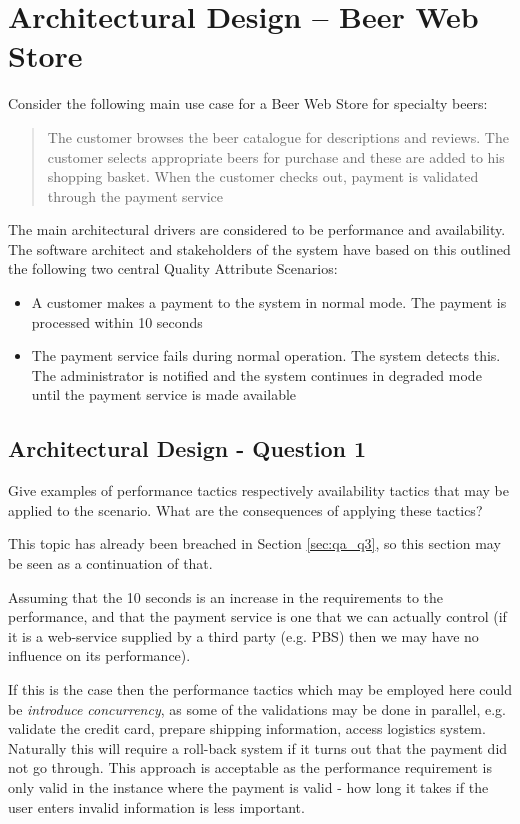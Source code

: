 \section{Architectural Design -- Beer Web Store}
Consider the following main use case for a Beer Web Store for specialty
beers:
\begin{quote}
  The customer browses the beer catalogue for descriptions and
  reviews. The customer selects appropriate beers for purchase and
  these are added to his shopping basket. When the customer checks
  out, payment is validated through the payment service
\end{quote}
The main architectural drivers are considered to be performance and
availability. The software architect and stakeholders of the system
have based on this outlined the following two central Quality
Attribute Scenarios:
\begin{itemize}
  \item A customer makes a payment to the system in normal mode. The
  payment is processed within 10 seconds
  \item The payment service fails during normal operation. The system
  detects this. The administrator is notified and the system continues
  in degraded mode until the payment service is made available
\end{itemize}

\subsection{Architectural Design - Question 1}

\begin{question}
Give examples of performance tactics respectively availability
tactics that may be applied to the scenario. What are the consequences
of applying these tactics?
\end{question}

This topic has already been breached in Section \ref{sec:qa_q3}, so this section may be seen as a continuation of that.

Assuming that the 10 seconds is an increase in the requirements to the performance, and that the payment service is one that we can actually control (if it is a web-service supplied by a third party (e.g. PBS) then we may have no influence on its performance). 

If this is the case then the performance tactics which may be employed here could be \emph{introduce concurrency}, as some of the validations may be done in parallel, e.g. validate the credit card, prepare shipping information, access logistics system. Naturally this will require a roll-back system if it turns out that the payment did not go through. This approach is acceptable as the performance requirement is only valid in the instance where the payment is valid - how long it takes if the user enters invalid information is less important. 

